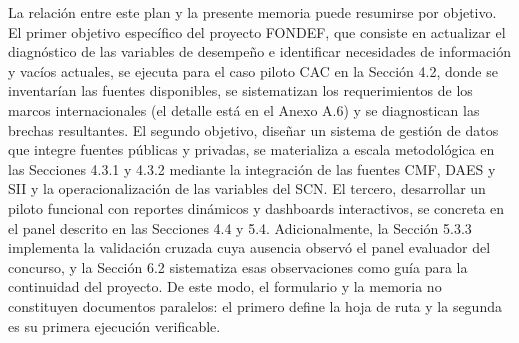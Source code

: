 La relación entre este plan y la presente memoria puede resumirse por objetivo. El primer objetivo específico del proyecto FONDEF, que consiste en actualizar el diagnóstico de las variables de desempeño e identificar necesidades de información y vacíos actuales, se ejecuta para el caso piloto CAC en la Sección 4.2, donde se inventarían las fuentes disponibles, se sistematizan los requerimientos de los marcos internacionales (el detalle está en el Anexo A.6) y se diagnostican las brechas resultantes. El segundo objetivo, diseñar un sistema de gestión de datos que integre fuentes públicas y privadas, se materializa a escala metodológica en las Secciones 4.3.1 y 4.3.2 mediante la integración de las fuentes CMF, DAES y SII y la operacionalización de las variables del SCN. El tercero, desarrollar un piloto funcional con reportes dinámicos y dashboards interactivos, se concreta en el panel descrito en las Secciones 4.4 y 5.4. Adicionalmente, la Sección 5.3.3 implementa la validación cruzada cuya ausencia observó el panel evaluador del concurso, y la Sección 6.2 sistematiza esas observaciones como guía para la continuidad del proyecto. De este modo, el formulario y la memoria no constituyen documentos paralelos: el primero define la hoja de ruta y la segunda es su primera ejecución verificable.
